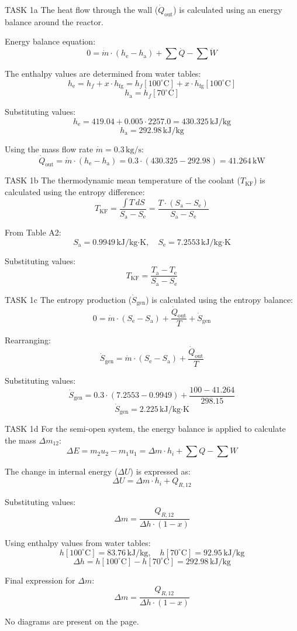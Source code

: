 TASK 1a  
The heat flow through the wall (\( \dot{Q}_{\text{out}} \)) is calculated using an energy balance around the reactor.  

Energy balance equation:  
\[
0 = \dot{m} \cdot (h_{\text{e}} - h_{\text{a}}) + \sum \dot{Q} - \sum \dot{W}
\]  

The enthalpy values are determined from water tables:  
\[
h_{\text{e}} = h_f + x \cdot h_{\text{fg}} = h_f[100^\circ\text{C}] + x \cdot h_{\text{fg}}[100^\circ\text{C}]
\]  
\[
h_{\text{a}} = h_f[70^\circ\text{C}]
\]  

Substituting values:  
\[
h_{\text{e}} = 419.04 + 0.005 \cdot 2257.0 = 430.325 \, \text{kJ/kg}
\]  
\[
h_{\text{a}} = 292.98 \, \text{kJ/kg}
\]  

Using the mass flow rate \( \dot{m} = 0.3 \, \text{kg/s} \):  
\[
\dot{Q}_{\text{out}} = \dot{m} \cdot (h_{\text{e}} - h_{\text{a}}) = 0.3 \cdot (430.325 - 292.98) = 41.264 \, \text{kW}
\]  

TASK 1b  
The thermodynamic mean temperature of the coolant (\( T_{\text{KF}} \)) is calculated using the entropy difference:  
\[
T_{\text{KF}} = \frac{\int T \, dS}{S_{\text{a}} - S_{\text{e}}} = \frac{T \cdot (S_{\text{a}} - S_{\text{e}})}{S_{\text{a}} - S_{\text{e}}}
\]  

From Table A2:  
\[
S_{\text{a}} = 0.9949 \, \text{kJ/kg·K}, \quad S_{\text{e}} = 7.2553 \, \text{kJ/kg·K}
\]  

Substituting values:  
\[
T_{\text{KF}} = \frac{T_{\text{a}} - T_{\text{e}}}{S_{\text{a}} - S_{\text{e}}}
\]  

TASK 1c  
The entropy production (\( \dot{S}_{\text{gen}} \)) is calculated using the entropy balance:  
\[
0 = \dot{m} \cdot (S_{\text{e}} - S_{\text{a}}) + \frac{\dot{Q}_{\text{out}}}{T} + \dot{S}_{\text{gen}}
\]  

Rearranging:  
\[
\dot{S}_{\text{gen}} = \dot{m} \cdot (S_{\text{e}} - S_{\text{a}}) + \frac{\dot{Q}_{\text{out}}}{T}
\]  

Substituting values:  
\[
\dot{S}_{\text{gen}} = 0.3 \cdot (7.2553 - 0.9949) + \frac{100 - 41.264}{298.15}
\]  
\[
\dot{S}_{\text{gen}} = 2.225 \, \text{kJ/kg·K}
\]  

TASK 1d  
For the semi-open system, the energy balance is applied to calculate the mass \( \Delta m_{12} \):  
\[
\Delta E = m_2 u_2 - m_1 u_1 = \Delta m \cdot h_i + \sum Q - \sum W
\]  

The change in internal energy (\( \Delta U \)) is expressed as:  
\[
\Delta U = \Delta m \cdot h_i + Q_{R,12}
\]  

Substituting values:  
\[
\Delta m = \frac{Q_{R,12}}{\Delta h \cdot (1 - x)}
\]  

Using enthalpy values from water tables:  
\[
h[100^\circ\text{C}] = 83.76 \, \text{kJ/kg}, \quad h[70^\circ\text{C}] = 92.95 \, \text{kJ/kg}
\]  
\[
\Delta h = h[100^\circ\text{C}] - h[70^\circ\text{C}] = 292.98 \, \text{kJ/kg}
\]  

Final expression for \( \Delta m \):  
\[
\Delta m = \frac{Q_{R,12}}{\Delta h \cdot (1 - x)}
\]  

No diagrams are present on the page.